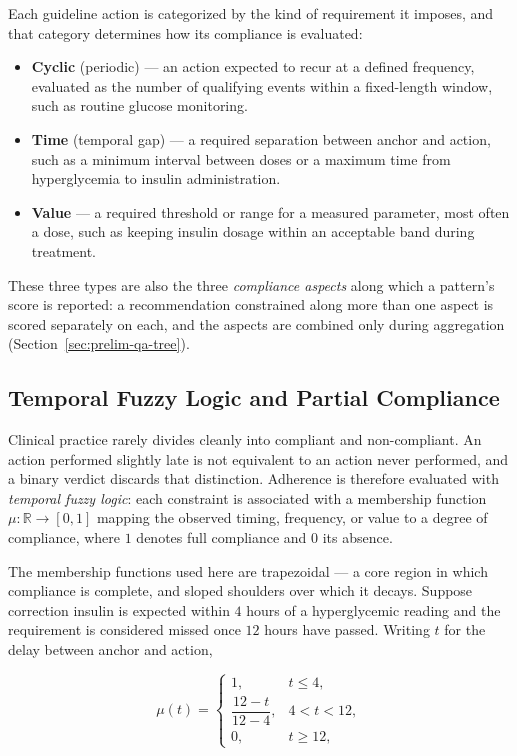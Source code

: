 Each guideline action is categorized by the kind of requirement it imposes, and that category determines how its compliance is evaluated:

\begin{itemize}
\item \textbf{Cyclic} (periodic) --- an action expected to recur at a defined frequency, evaluated as the number of qualifying events within a fixed-length window, such as routine glucose monitoring.
\item \textbf{Time} (temporal gap) --- a required separation between anchor and action, such as a minimum interval between doses or a maximum time from hyperglycemia to insulin administration.
\item \textbf{Value} --- a required threshold or range for a measured parameter, most often a dose, such as keeping insulin dosage within an acceptable band during treatment.
\end{itemize}

These three types are also the three \emph{compliance aspects} along which a pattern's score is reported: a recommendation constrained along more than one aspect is scored separately on each, and the aspects are combined only during aggregation (Section~\ref{sec:prelim-qa-tree}).

\subsection{Temporal Fuzzy Logic and Partial Compliance}

Clinical practice rarely divides cleanly into compliant and non-compliant. An action performed slightly late is not equivalent to an action never performed, and a binary verdict discards that distinction. Adherence is therefore evaluated with \emph{temporal fuzzy logic}: each constraint is associated with a membership function $\mu : \mathbb{R} \to [0,1]$ mapping the observed timing, frequency, or value to a degree of compliance, where $1$ denotes full compliance and $0$ its absence.

The membership functions used here are trapezoidal --- a core region in which compliance is complete, and sloped shoulders over which it decays. Suppose correction insulin is expected within $4$ hours of a hyperglycemic reading and the requirement is considered missed once $12$ hours have passed. Writing $t$ for the delay between anchor and action,

\[
\mu(t) =
\begin{cases}
1, & t \le 4, \\[4pt]
\dfrac{12 - t}{12 - 4}, & 4 < t < 12, \\[6pt]
0, & t \ge 12,
\end{cases}
\]

